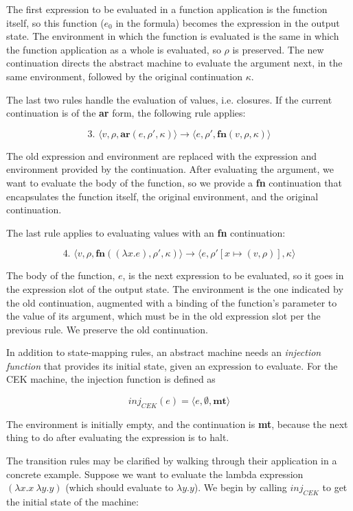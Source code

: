\documentclass{article}
\begin{document}
The first expression to be evaluated in a function application is the function itself, so this function ($e_0$ in the formula) becomes the expression in the output state. The environment in which the function is evaluated is the same in which the function application as a whole is evaluated, so $\rho$ is preserved. The new continuation directs the abstract machine to evaluate the argument next, in the same environment, followed by the original continuation $\kappa$.

The last two rules handle the evaluation of values, i.e. closures. If the current continuation is of the \textbf{ar} form, the following rule applies:

$$
\text{3. }
\langle v, \rho, \textbf{ar}(e, \rho', \kappa) \rangle
\to
\langle e, \rho', \textbf{fn}(v, \rho, \kappa) \rangle
$$

The old expression and environment are replaced with the expression and environment provided by the continuation. After evaluating the argument, we want to evaluate the body of the function, so we provide a \textbf{fn} continuation that encapsulates the function itself, the original environment, and the original continuation.

The last rule applies to evaluating values with an \textbf{fn} continuation:

$$
\text{4. }
\langle v, \rho, \textbf{fn}((\lambda x.e), \rho', \kappa) \rangle
\to
\langle e, \rho'[x \mapsto (v, \rho)], \kappa \rangle
$$

The body of the function, $e$, is the next expression to be evaluated, so it goes in the expression slot of the output state. The environment is the one indicated by the old continuation, augmented with a binding of the function's parameter to the value of its argument, which must be in the old expression slot per the previous rule. We preserve the old continuation.

In addition to state-mapping rules, an abstract machine needs an \textit{injection function} that provides its initial state, given an expression to evaluate. For the CEK machine, the injection function is defined as

$$ inj_{CEK}(e) = \langle e, \emptyset, \textbf{mt} \rangle $$

The environment is initially empty, and the continuation is \textbf{mt}, because the next thing to do after evaluating the expression is to halt.

The transition rules may be clarified by walking through their application in a concrete example. Suppose we want to evaluate the lambda expression $(\lambda x.x\ \lambda y.y)$ (which should evaluate to $\lambda y.y$). We begin by calling $inj_{CEK}$ to get the initial state of the machine:
\end{document}
